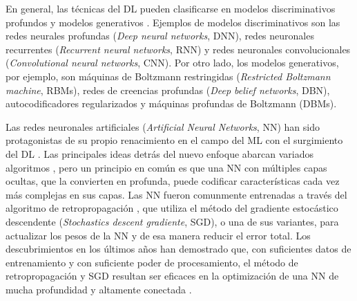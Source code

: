 En general, las técnicas del DL pueden clasificarse en modelos discriminativos profundos y modelos generativos \cite{Deng2014}. Ejemplos de modelos discriminativos son las redes neurales profundas ({\em Deep neural networks}, DNN), redes neuronales recurrentes ({\em Recurrent neural networks}, RNN) y redes neuronales convolucionales ({\em Convolutional neural networks}, CNN). Por otro lado, los modelos generativos, por ejemplo, son máquinas de Boltzmann restringidas ({\em Restricted Boltzmann machine}, RBMs), redes de creencias profundas ({\em Deep belief networks}, DBN), autocodificadores regularizados y máquinas profundas de Boltzmann (DBMs).


Las redes neuronales artificiales ({\em Artificial Neural Networks}, NN) han sido protagonistas de su propio renacimiento en el campo del ML con el surgimiento del DL \cite{Bengio2006, Hinton2006, Le2012, Ranzato2007}. Las principales ideas detrás del nuevo enfoque abarcan variados algoritmos \cite{Bengio2007, Hinton2006}, pero un principio en común es que una NN con múltiples capas ocultas, que la convierten en profunda, puede codificar características cada vez más complejas en sus capas. Las NN fueron comunmente entrenadas a través del algoritmo de retropropagación \cite{Rumelhart1986b}, que utiliza el método del gradiente estocástico descendente ({\em Stochastics descent gradiente}, SGD), o una de sus variantes, para actualizar los pesos de la NN y de esa manera reducir el error total. Los descubrimientos en los últimos años han demostrado que, con suficientes datos de entrenamiento y con suficiente poder de procesamiento, el método de retropropagación y SGD resultan ser eficaces en la optimización de una NN de mucha profundidad y altamente conectada \cite{Ciresan2012, He2015, Le2012}. %




